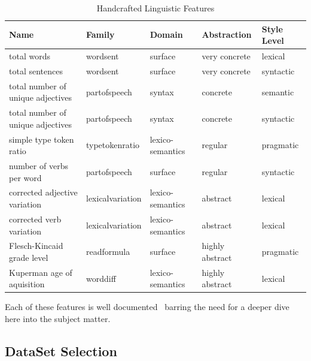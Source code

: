 \documentclass[runningheads,a4paper,11pt]{article}
\begin{document}
\begin{table}[ht]
    \setlength\tabcolsep{6pt}
    \centering
    \begin{tabular}{@{}lllll@{}}
        \toprule
        Name                              & Family           & Domain           & Abstraction     & Style Level\footnotemark \\ \toprule
        total words                       & wordsent         & surface          & very concrete   & lexical                  \\
        total sentences                   & wordsent         & surface          & very concrete   & syntactic                \\ \bottomrule
        total number of unique adjectives & partofspeech     & syntax           & concrete        & semantic                 \\
        total number of unique adjectives & partofspeech     & syntax           & concrete        & syntactic                \\ \bottomrule
        simple type token ratio           & typetokenratio   & lexico-semantics & regular         & pragmatic                \\
        number of verbs per word          & partofspeech     & surface          & regular         & syntactic                \\ \bottomrule
        corrected adjective variation     & lexicalvariation & lexico-semantics & abstract        & lexical                  \\
        corrected verb variation          & lexicalvariation & lexico-semantics & abstract        & lexical                  \\ \bottomrule
        Flesch-Kincaid grade level        & readformula      & surface          & highly abstract & pragmatic                \\
        Kuperman age of aquisition        & worddiff         & lexico-semantics & highly abstract & lexical                  \\ \bottomrule
    \end{tabular}
    \caption{Handcrafted Linguistic Features}\label{table-hlf}
\end{table}

Each of these features is well documented~\cite{lftk-2023} barring the need for
a deeper dive here into the subject matter.

\subsection{DataSet Selection}\label{ds-selection}
\end{document}
